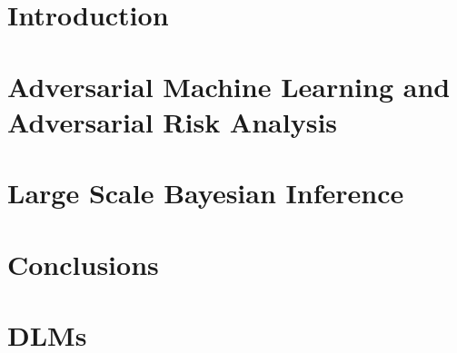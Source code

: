 \documentclass[a4paper, 11pt, openright, twoside]{reportPhD}
\numberwithin{equation}{section}
\numberwithin{figure}{chapter}
\numberwithin{table}{chapter}
\begin{document}
\chapter{Introduction}\label{cha:intro}

\setcounter{page}{1}



\chapter{Adversarial Machine Learning and Adversarial Risk Analysis}\label{cha:amlara}
%

%

\chapter{Large Scale Bayesian Inference}\label{cha:bayes}



%


%

\chapter{Conclusions}\label{cha:conclusions}





\iffalse


\chapter{DLMs}\label{cha:dlm}

\end{document}
